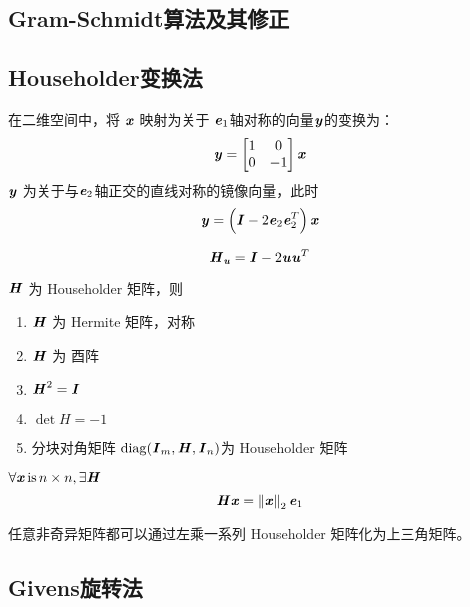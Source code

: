 \subsection{Gram-Schmidt算法及其修正}
\label{sub:Gram-Schmidt算法及其修正}

\subsection{Householder变换法}
\label{sub:Householder变换法}

在二维空间中，将 $\Vx$ 映射为关于 $\Ve_1$轴对称的向量$\Vy$的变换为：
\[
    \Vy = \begin{bmatrix}
        1 & 0 \\
        0 & -1
    \end{bmatrix} \Vx
\]
$\Vy$ 为关于与$\Ve_2$轴正交的直线对称的镜像向量，此时
\[
    \Vy = \left( \MI - 2\Ve_2 \Ve_2^T\right) \Vx
\]

\begin{definition}
    $$
    \MH_{\Vu} = \MI - 2\Vu \Vu^T
    $$
\end{definition}

\begin{lemma}
    $\MH$ 为 Householder 矩阵，则
    \begin{enumerate}
        \item $\MH$ 为 Hermite 矩阵，对称
        \item $\MH$ 为 酉阵
        \item $\MH^2 = \MI$
        \item $\det H = -1$
        \item 分块对角矩阵 $\diag(\MI_m, \MH, \MI_n)$为 Householder 矩阵
    \end{enumerate}
\end{lemma}

\begin{lemma}
    $\forall \Vx \, \text{is}\, n \times n, \exists \MH$
    \[
        \MH \Vx = \left\lVert \Vx \right\rVert_2 \Ve_1
    \]
\end{lemma}

\begin{theorem}
    任意非奇异矩阵都可以通过左乘一系列 Householder 矩阵化为上三角矩阵。
\end{theorem}

\subsection{Givens旋转法}
\label{sub:Givens旋转法}


